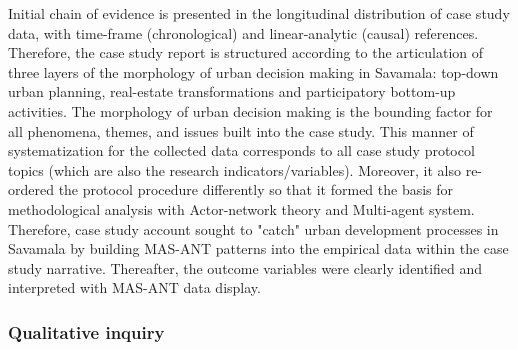 \documentclass[11pt]{report}
\begin{document}
Initial chain of evidence is presented in the longitudinal distribution of case study data, with time-frame (chronological) and linear-analytic (causal) references. Therefore, the case study report is structured according to the articulation of three layers of the morphology of urban decision making in Savamala: top-down urban planning, real-estate transformations and participatory bottom-up activities.
The morphology of urban decision making is the bounding factor for all phenomena, themes, and issues built into the case study. This manner of systematization for the collected data corresponds to all case study protocol topics (which are also the research indicators/variables).
Moreover, it also re-ordered the protocol procedure differently so that it formed the basis for methodological analysis with Actor-network theory and Multi-agent system.
Therefore, case study account sought to "catch" urban development processes in Savamala by building MAS-ANT patterns into the empirical data within the case study narrative. Thereafter, the outcome variables were clearly identified and interpreted with MAS-ANT data display. 

\subsubsection{Qualitative inquiry}
\end{document}
